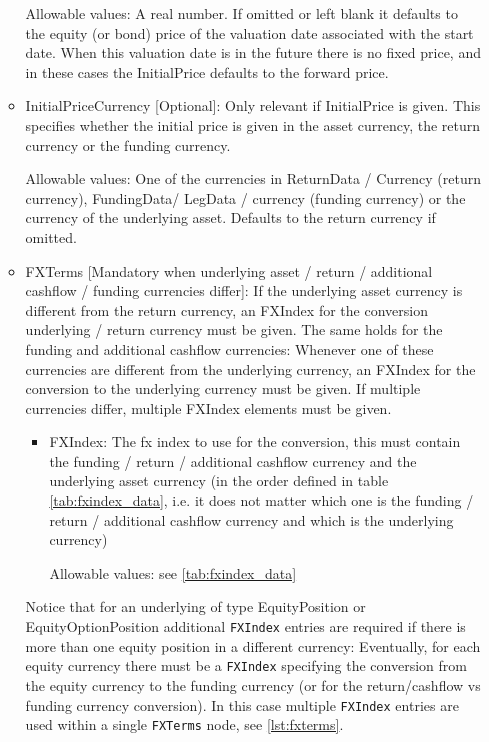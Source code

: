 \begin{itemize}
\begin{itemize}
    Allowable values: A real number. If omitted or left blank it defaults to the equity (or bond) price of the valuation
    date associated with the start date. When this valuation date is in the future there is no fixed price, 
    and in these cases the InitialPrice defaults to the forward price.
    
  \item InitialPriceCurrency [Optional]: Only relevant if InitialPrice is given. This specifies whether the initial
    price is given in the asset currency, the return currency or the funding currency.
    
    Allowable values: One of the currencies in ReturnData / Currency (return currency), FundingData/ LegData / currency
    (funding currency) or the currency of the underlying asset. Defaults to the return currency if omitted.

  \item FXTerms [Mandatory when underlying asset / return / additional cashflow / funding currencies differ]: If the
    underlying asset currency is different from the return currency, an FXIndex for the conversion underlying / return currency
    must be given. The same holds for the funding and additional cashflow currencies: Whenever one of these currencies
    are different from the underlying currency, an FXIndex for the conversion to the underlying currency must be given. If multiple currencies differ, 
    multiple FXIndex elements must be given.

    \begin{itemize}
    \item FXIndex: The fx index to use for the conversion, this must contain the funding / return / additional cashflow
      currency and the underlying asset currency (in the order defined in table \ref{tab:fxindex_data}, i.e. it does not
      matter which one is the funding / return / additional cashflow currency and which is the underlying currency)
        
        Allowable values: see \ref{tab:fxindex_data}
    \end{itemize}

    Notice that for an underlying of type EquityPosition or EquityOptionPosition additional \verb+FXIndex+
    entries are required if there is more than one equity position in a different currency: Eventually, for each equity currency there must be a \verb+FXIndex+ specifying the
    conversion from the equity currency to the funding currency (or for the return/cashflow vs funding currency conversion). In this case multiple \verb+FXIndex+ entries are used within a single \lstinline!FXTerms! node, see \ref{lst:fxterms}. 
    

\end{itemize}
\end{itemize}
